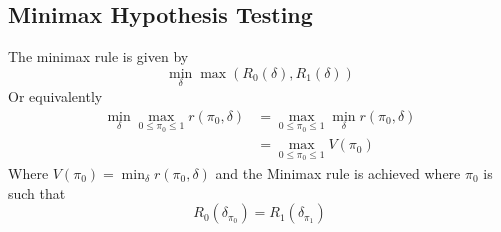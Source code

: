 \documentclass[a4paper,english,12pt]{article}
\begin{document}
\subsection{Minimax Hypothesis Testing}
The minimax rule is given by
\begin{equation}
\min_{\delta}\max({R_{0}(\delta),R_{1}(\delta)})
\end{equation}
Or equivalently
\begin{align}
\min_{\delta}\max_{0 \leq \pi_{0} \leq 1}r(\pi_{0},\delta)&= \max_{0 \leq \pi_{0} \leq 1}\min_{\delta}r(\pi_{0},\delta)\nonumber\\
														  &= \max_{0 \leq \pi_{0} \leq 1}V(\pi_{0})
\end{align}
Where $V(\pi_{0})=\min_{\delta}r(\pi_{0},\delta)$ and the Minimax rule is achieved where $\pi_{0}$ is such that
\begin{equation} 
R_{0}(\delta_{\pi_{0}})=R_{1}(\delta_{\pi_{1}})
\end{equation}
\end{document}
